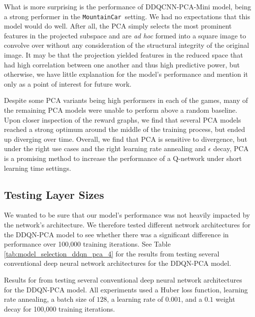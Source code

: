 \documentclass[11pt]{article}
\newcommand{\mc}{\texttt{MountainCar}}
\begin{document}
What is more surprising is the performance of DDQCNN-PCA-Mini model, being a strong performer in the \mc~setting. We had no expectations that this model would do well. After all, the PCA simply selects the most prominent features in the projected subspace and are \textit{ad hoc} formed into a square image to convolve over without any consideration of the structural integrity of the original image. It may be that the projection yielded features in the reduced space that had high correlation between one another and thus high predictive power, but otherwise, we have little explanation for the model's performance and mention it only as a point of interest for future work. 

Despite some PCA variants being high performers in each of the games, many of the remaining PCA models were unable to perform above a random baseline. Upon closer inspection of the reward graphs, we find that several PCA models reached a strong optimum around the middle of the training process, but ended up diverging over time. Overall, we find that PCA is sensitive to divergence, but under the right use cases and the right learning rate annealing and $\epsilon$ decay, PCA is a promising method to increase the performance of a Q-network under short learning time settings.

\subsection{Testing Layer Sizes}

We wanted to be sure that our model's performance was not heavily impacted by the network's architecture. We therefore tested different network architectures for the DDQN-PCA model to see whether there was a significant difference in performance over 100,000 training iterations. See Table \ref{tab:model_selection_ddqn_pca_4} for the results from testing several conventional deep neural network architectures for the DDQN-PCA model.

\begin{table}[!ht]
  \centering
  
  
  \caption{Results for from testing several conventional deep neural network architectures for the DDQN-PCA model. All experiments used a Huber loss function, learning rate annealing, a batch size of $128$, a learning rate of $0.001$, and a $0.1$ weight decay for 100,000 training iterations.}
  \label{tab:model_selection_ddqn_pca_4}
\end{table}
\end{document}
